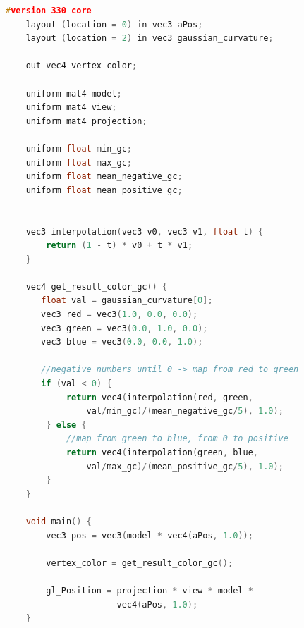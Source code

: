 \begin{lstlisting}[language=C++,
    directivestyle={\color{black}}
    emph={int,char,double,float,unsigned},
    emphstyle={\color{blue}}
   ]
    #version 330 core
    layout (location = 0) in vec3 aPos;
    layout (location = 2) in vec3 gaussian_curvature;

    out vec4 vertex_color;

    uniform mat4 model;
    uniform mat4 view;
    uniform mat4 projection;

    uniform float min_gc;
    uniform float max_gc;
    uniform float mean_negative_gc;
    uniform float mean_positive_gc;


    vec3 interpolation(vec3 v0, vec3 v1, float t) {
        return (1 - t) * v0 + t * v1;
    }

    vec4 get_result_color_gc() {
       float val = gaussian_curvature[0];
       vec3 red = vec3(1.0, 0.0, 0.0);
       vec3 green = vec3(0.0, 1.0, 0.0);
       vec3 blue = vec3(0.0, 0.0, 1.0);

       //negative numbers until 0 -> map from red to green
       if (val < 0) {
            return vec4(interpolation(red, green,
                val/min_gc)/(mean_negative_gc/5), 1.0);
        } else {
            //map from green to blue, from 0 to positive
            return vec4(interpolation(green, blue,
                val/max_gc)/(mean_positive_gc/5), 1.0);
        }
    }

    void main() {
        vec3 pos = vec3(model * vec4(aPos, 1.0));

        vertex_color = get_result_color_gc();

        gl_Position = projection * view * model *
                      vec4(aPos, 1.0);
    }
\end{lstlisting}

